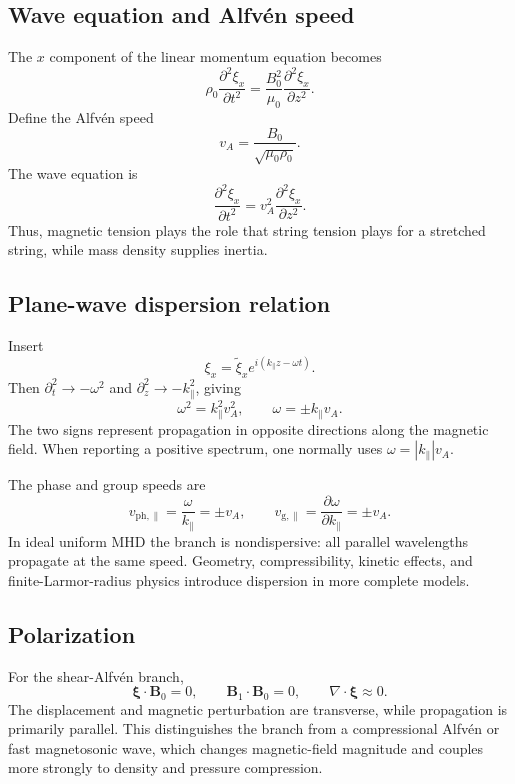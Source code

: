 \subsection{Wave equation and Alfv\'en speed}
The $x$ component of the linear momentum equation becomes
\begin{equation}
\rho_0\frac{\partial^2\xi_x}{\partial t^2}
=\frac{B_0^2}{\mu_0}\frac{\partial^2\xi_x}{\partial z^2}.
\end{equation}
Define the Alfv\'en speed
\begin{equation}
\boxed{v_A=\frac{B_0}{\sqrt{\mu_0\rho_0}}.}
\label{eq:alfven_speed}
\end{equation}
The wave equation is
\begin{equation}
\boxed{
\frac{\partial^2\xi_x}{\partial t^2}
=v_A^2\frac{\partial^2\xi_x}{\partial z^2}.}
\label{eq:shear_alfven_wave_equation}
\end{equation}
Thus, magnetic tension plays the role that string tension plays for a stretched string, while mass density supplies inertia.

\subsection{Plane-wave dispersion relation}
Insert
\begin{equation}
\xi_x=\widetilde\xi_x e^{i(k_\parallel z-\omega t)}.
\end{equation}
Then $\partial_t^2\rightarrow-\omega^2$ and $\partial_z^2\rightarrow-k_\parallel^2$, giving
\begin{equation}
\boxed{\omega^2=k_\parallel^2v_A^2,\qquad \omega=\pm k_\parallel v_A.}
\label{eq:uniform_alfven_dispersion}
\end{equation}
The two signs represent propagation in opposite directions along the magnetic field. When reporting a positive spectrum, one normally uses $\omega=|k_\parallel|v_A$.

The phase and group speeds are
\begin{equation}
v_{\mathrm{ph},\parallel}=\frac{\omega}{k_\parallel}=\pm v_A,
\qquad
v_{\mathrm g,\parallel}=\frac{\partial\omega}{\partial k_\parallel}=\pm v_A.
\end{equation}
In ideal uniform MHD the branch is nondispersive: all parallel wavelengths propagate at the same speed. Geometry, compressibility, kinetic effects, and finite-Larmor-radius physics introduce dispersion in more complete models.

\subsection{Polarization}
For the shear-Alfv\'en branch,
\begin{equation}
\boldsymbol\xi\cdot\mathbf B_0=0,
\qquad
\mathbf B_1\cdot\mathbf B_0=0,
\qquad
\nabla\cdot\boldsymbol\xi\approx0.
\end{equation}
The displacement and magnetic perturbation are transverse, while propagation is primarily parallel. This distinguishes the branch from a compressional Alfv\'en or fast magnetosonic wave, which changes magnetic-field magnitude and couples more strongly to density and pressure compression.

